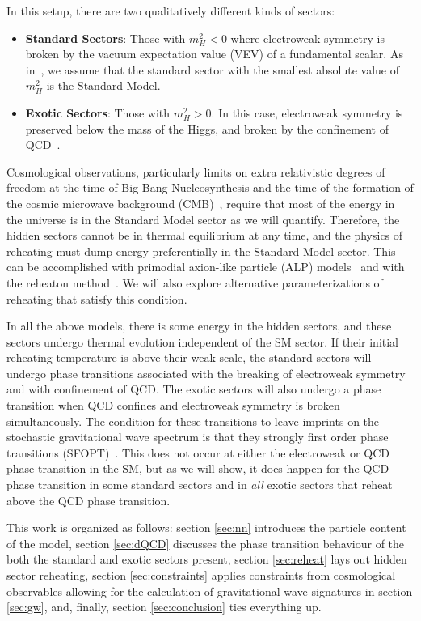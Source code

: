 \documentclass[nofootinbib,twocolumn,preprintnumbers]{revtex4-1}
\begin{document}
In this setup, there are two qualitatively different kinds of sectors:
\begin{itemize}
\item \textbf{Standard Sectors}: Those with $m_H^2 < 0$ where electroweak symmetry is broken by the vacuum expectation value (VEV) of a fundamental scalar. As in~\cite{Arkani-Hamed:2016rle}, we assume that the standard sector with the smallest absolute value of $m_H^2$ is the Standard Model.
\item \textbf{Exotic Sectors}: Those with  $m_H^2 > 0$. In this case, electroweak symmetry is preserved below the mass of the Higgs, and broken by the confinement of QCD~\cite{Susskind:1978ms}.
\end{itemize}
Cosmological observations, particularly limits on extra relativistic degrees of freedom at the time of Big Bang Nucleosynthesis and the time of the formation of the cosmic microwave background (CMB)~\cite{Aghanim:2018eyx}, require that most of the energy in the universe is in the Standard Model sector as we will quantify. Therefore, the hidden sectors cannot be in thermal equilibrium at any time, and the physics of reheating must dump energy preferentially in the Standard Model sector. This can be accomplished with primodial axion-like particle (ALP) models~\cite{MARSH20161,PhysRevLett.121.201303} and with the reheaton method~\cite{Arkani-Hamed:2016rle}. We will also explore alternative parameterizations of reheating that satisfy this condition.

In all the above models, there is some energy in the hidden sectors, and these sectors undergo thermal evolution independent of the SM sector. If their initial reheating temperature is above their weak scale, the standard sectors will undergo phase transitions associated with the breaking of electroweak symmetry and with confinement of QCD. The exotic sectors will also undergo a phase transition when QCD confines and electroweak symmetry is broken simultaneously. The condition for these transitions to leave imprints on the stochastic gravitational wave spectrum is that they strongly first order phase transitions (SFOPT)~\cite{Witten:1984rs,Hogan:1984hx,Hogan:1986qda,PhysRevLett.65.3080}. This does not occur at either the electroweak or QCD phase transition in the SM, but as we will show, it does happen for the QCD phase transition in some standard sectors and in \textit{all} exotic sectors that reheat above the QCD phase transition. 

This work is organized as follows: section \ref{sec:nn} introduces the particle content of the model, section \ref{sec:dQCD} discusses the phase transition behaviour of the both the standard and exotic sectors present, section \ref{sec:reheat} lays out hidden sector reheating, section \ref{sec:constraints} applies constraints from cosmological observables allowing for the calculation of gravitational wave signatures in section \ref{sec:gw}, and, finally, section \ref{sec:conclusion} ties everything up.
\end{document}
